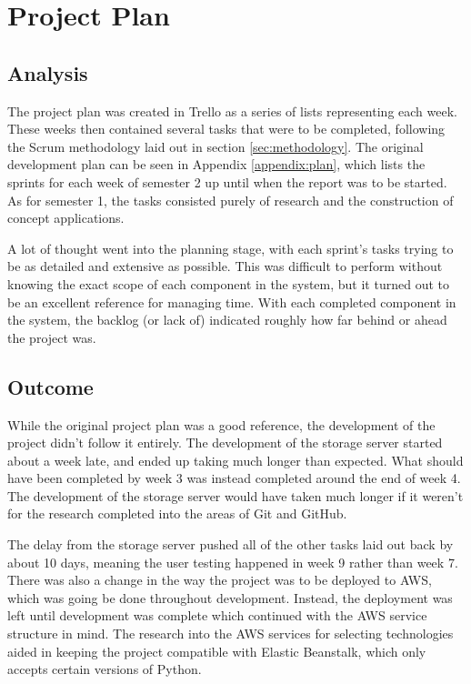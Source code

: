 \chapter{Project Plan}
\section{Analysis}
The project plan was created in Trello as a series of lists representing each week. These weeks then contained several tasks that were to be completed, following the Scrum methodology laid out in section \ref{sec:methodology}. The original development plan can be seen in Appendix \ref{appendix:plan}, which lists the sprints for each week of semester 2 up until when the report was to be started. As for semester 1, the tasks consisted purely of research and the construction of concept applications.

A lot of thought went into the planning stage, with each sprint's tasks trying to be as detailed and extensive as possible. This was difficult to perform without knowing the exact scope of each component in the system, but it turned out to be an excellent reference for managing time. With each completed component in the system, the backlog (or lack of) indicated roughly how far behind or ahead the project was.

\section{Outcome}
While the original project plan was a good reference, the development of the project didn't follow it entirely. The development of the storage server started about a week late, and ended up taking much longer than expected. What should have been completed by week 3 was instead completed around the end of week 4. The development of the storage server would have taken much longer if it weren't for the research completed into the areas of Git and GitHub.

The delay from the storage server pushed all of the other tasks laid out back by about 10 days, meaning the user testing happened in week 9 rather than week 7. There was also a change in the way the project was to be deployed to AWS, which was going be done throughout development. Instead, the deployment was left until development was complete which continued with the AWS service structure in mind. The research into the AWS services for selecting technologies aided in keeping the project compatible with Elastic Beanstalk, which only accepts certain versions of Python.

